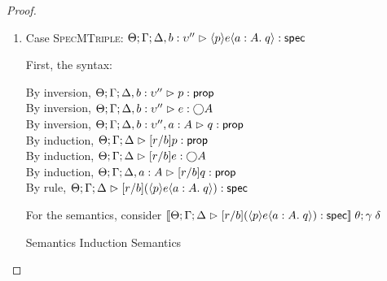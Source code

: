 \begin{proof}
\begin{enumerate}
\item Case \textsc{SpecMTriple}: $\judgeS[\Theta; \Gamma; \Delta, b:\upsilon'']{\mspec{p}{e}{a:A}{q}}$
  
  First, the syntax:
  \begin{tabbedproof}
    \oo By inversion, $\judgeA[\Theta; \Gamma; \Delta, b:\upsilon'']{p}{\assert}$ \\
    \oo By inversion, $\judgeA[\Theta; \Gamma; \Delta, b:\upsilon'']{e}{\monad{A}}$ \\
    \oo By inversion, $\judgeA[\Theta; \Gamma; \Delta, b:\upsilon'', a:A]{q}{\assert}$ \\
    \oo By induction, $\judgeA[\Theta; \Gamma; \Delta]{[r/b]p}{\assert}$ \\
    \oo By induction, $\judgeA[\Theta; \Gamma; \Delta]{[r/b]e}{\monad{A}}$ \\
    \oo By induction, $\judgeA[\Theta; \Gamma; \Delta, a:A]{[r/b]q}{\assert}$ \\
    \oo By rule, $\judgeS[\Theta; \Gamma; \Delta]{[r/b](\mspec{p}{e}{a:A}{q})}$
  \end{tabbedproof}

  For the semantics, consider $\interp{\judgeS[\Theta; \Gamma; \Delta]{[r/b](\mspec{p}{e}{a:A}{q})}}\;\theta;\gamma\;\delta$
  \begin{eqnproof}
          {Semantics}
          {Induction}
          {Semantics}
  \end{eqnproof}


\end{enumerate}
\end{proof}
